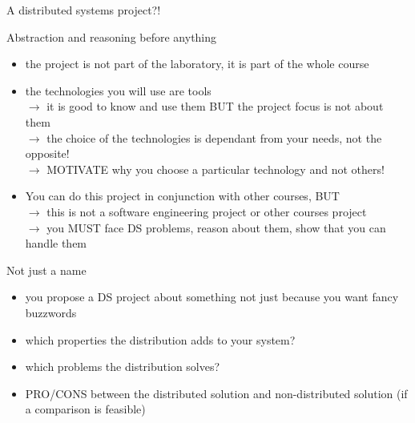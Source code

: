 \documentclass[presentation]{beamer}\mode<presentation>{\usetheme{AMSBolognaFC}}
\begin{document}
\begin{frame}[c,allowframebreaks]{A distributed systems project?!}
    \begin{block}{Abstraction and reasoning before anything}
        \begin{itemize}
            \item the project is not part of the laboratory, it is part of the whole course
            \item the technologies you will use are tools
            \\
            $\rightarrow$ it is good to know and use them \alert{BUT} the project focus is not about them
            \\
            $\rightarrow$ the choice of the technologies is dependant from your needs, not the opposite!
            \\
            $\rightarrow$ \alert{MOTIVATE} why you choose a particular technology and not others!
            \item You can do this project in conjunction with other courses, \alert{BUT}
            \\
            $\rightarrow$ this is not a software engineering project or other courses project 
            \\
            $\rightarrow$ you \alert{MUST} face DS problems, reason about them, show that you can handle them
        \end{itemize}
    \end{block}
    
    \framebreak
    
    \begin{block}{Not just a name}
        \begin{itemize}
            \item you propose a DS project about something not just because you want fancy buzzwords
            \item which properties the distribution adds to your system?
            \item which problems the distribution solves?
            \item PRO/CONS between the distributed solution and non-distributed solution (if a comparison is feasible)
        \end{itemize}
    \end{block}
    
\end{frame}
\end{document}
